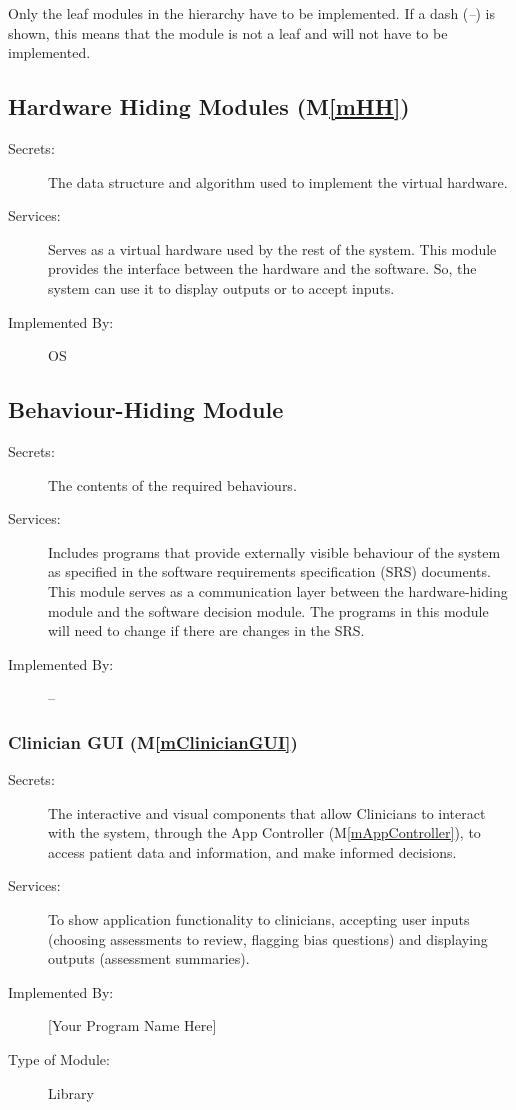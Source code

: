 \documentclass[12pt, titlepage]{article}
\newcommand{\mref}[1]{M\ref{#1}}
\begin{document}
Only the leaf modules in the hierarchy have to be implemented. If a dash
(\emph{--}) is shown, this means that the module is not a leaf and will not have
to be implemented.

\subsection{Hardware Hiding Modules (\mref{mHH})}

\begin{description}
\item[Secrets:]The data structure and algorithm used to implement the virtual
  hardware.
\item[Services:]Serves as a virtual hardware used by the rest of the
  system. This module provides the interface between the hardware and the
  software. So, the system can use it to display outputs or to accept inputs.
\item[Implemented By:] OS
\end{description}

\subsection{Behaviour-Hiding Module}

\begin{description}
\item[Secrets:]The contents of the required behaviours.
\item[Services:]Includes programs that provide externally visible behaviour of
  the system as specified in the software requirements specification (SRS)
  documents. This module serves as a communication layer between the
  hardware-hiding module and the software decision module. The programs in this
  module will need to change if there are changes in the SRS.
\item[Implemented By:] --
\end{description}

\subsubsection{Clinician GUI (\mref{mClinicianGUI})}

\begin{description}
\item[Secrets:]The interactive and visual components that allow Clinicians to interact with the system, through the App Controller (\mref{mAppController}),
               to access patient data and information, and make informed decisions.
\item[Services:]To show application functionality to clinicians, accepting user inputs (choosing assessments to review,
                flagging bias questions) and displaying outputs (assessment summaries).
\item[Implemented By:] [Your Program Name Here]
\item[Type of Module:] Library
\end{description}
\end{document}
